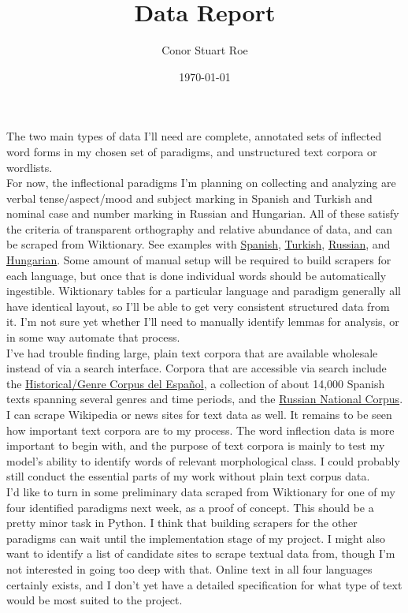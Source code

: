 \documentclass{article}
\title{Data Report}
\author{Conor Stuart Roe}
\date{\today}
\begin{document}
\thispagestyle{empty}
\maketitle

The two main types of data I'll need are complete, annotated sets of inflected word forms in my chosen set of paradigms, and unstructured text corpora or wordlists. \\

For now, the inflectional paradigms I'm planning on collecting and analyzing are verbal tense/aspect/mood and subject marking in Spanish and Turkish and nominal case and number marking in Russian and Hungarian. All of these satisfy the criteria of transparent orthography and relative abundance of data, and can be scraped from Wiktionary. See examples with \href{https://en.wiktionary.org/wiki/escoger#Spanish}{Spanish}, \href{https://en.wiktionary.org/wiki/okumak#Turkish}{Turkish}, \href{https://en.wiktionary.org/wiki/\%D1\%81\%D0\%BE\%D0\%B1\%D0\%B0\%D0\%BA\%D0\%B0#Russian}{Russian}, and \href{https://en.wiktionary.org/wiki/kutya#Hungarian}{Hungarian}. Some amount of manual setup will be required to build scrapers for each language, but once that is done individual words should be automatically ingestible. Wiktionary tables for a particular language and paradigm generally all have identical layout, so I'll be able to get very consistent structured data from it. I'm not sure yet whether I'll need to manually identify lemmas for analysis, or in some way automate that process. \\

I've had trouble finding large, plain text corpora that are available wholesale instead of via a search interface. Corpora that are accessible via search include the \href{https://www.corpusdelespanol.org/hist-gen/}{Historical/Genre Corpus del Español}, a collection of about 14,000 Spanish texts spanning several genres and time periods, and the \href{http://www.ruscorpora.ru/new/en/}{Russian National Corpus}. I can scrape Wikipedia or news sites for text data as well. It remains to be seen how important text corpora are to my process. The word inflection data is more important to begin with, and the purpose of text corpora is mainly to test my model's ability to identify words of relevant morphological class. I could probably still conduct the essential parts of my work without plain text corpus data. \\

I'd like to turn in some preliminary data scraped from Wiktionary for one of my four identified paradigms next week, as a proof of concept. This should be a pretty minor task in Python. I think that building scrapers for the other paradigms can wait until the implementation stage of my project. I might also want to identify a list of candidate sites to scrape textual data from, though I'm not interested in going too deep with that. Online text in all four languages certainly exists, and I don't yet have a detailed specification for what type of text would be most suited to the project.
\end{document}
